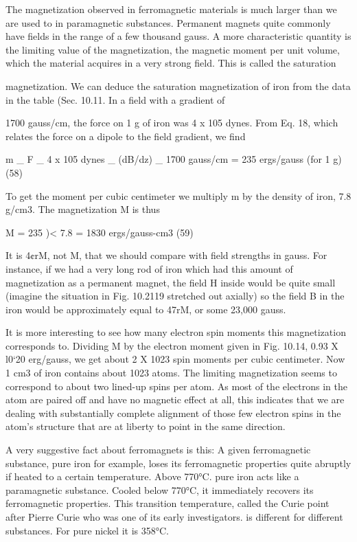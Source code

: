 {The magnetization observed in ferromagnetic materials is much
larger than we are used to in paramagnetic substances. Permanent
magnets quite commonly have fields in the range of a few thousand
gauss. A more characteristic quantity is the limiting value of the
magnetization, the magnetic moment per unit volume, which the
material acquires in a very strong field. This is called the saturation

magnetization. We can deduce the saturation magnetization of iron
from the data in the table (Sec. 10.11. In a field with a gradient of

1700 gauss/cm, the force on 1 g of iron was 4 x 105 dynes. From
Eq. 18, which relates the force on a dipole to the field gradient, we find
\begin{equation}
\end{equation}

m _ F _ 4 x 105 dynes
_ (dB/dz) _ 1700 gauss/cm
= 235 ergs/gauss (for 1 g) (58)

To get the moment per cubic centimeter we multiply m by the
density of iron, 7.8 g/cm3. The magnetization M is thus
\begin{equation}
\end{equation}

M = 235 )< 7.8 = 1830 ergs/gauss-cm3 (59)

It is 4¢rM, not M, that we should compare with field strengths in gauss.
For instance, if we had a very long rod of iron which had this amount
of magnetization as a permanent magnet, the field H inside would
be quite small (imagine the situation in Fig. 10.2119 stretched out
axially) so the field B in the iron would be approximately equal to
47rM, or some 23,000 gauss.

It is more interesting to see how many electron spin moments this
magnetization corresponds to. Dividing M by the electron moment
given in Fig. 10.14, 0.93 X l0‘20 erg/gauss, we get about 2 X 1023
spin moments per cubic centimeter. Now 1 cm3 of iron contains
about 1023 atoms. The limiting magnetization seems to correspond
to about two lined-up spins per atom. As most of the electrons in
the atom are paired off and have no magnetic effect at all, this indicates
that we are dealing with substantially complete alignment
of those few electron spins in the atom's structure that are at liberty
to point in the same direction.

A very suggestive fact about ferromagnets is this: A given ferromagnetic
substance, pure iron for example, loses its ferromagnetic
properties quite abruptly if heated to a certain temperature. Above
770°C. pure iron acts like a paramagnetic substance. Cooled below
770°C, it immediately recovers its ferromagnetic properties. This
transition temperature, called the Curie point after Pierre Curie who
was one of its early investigators. is different for different substances.
For pure nickel it is 358°C.

}
